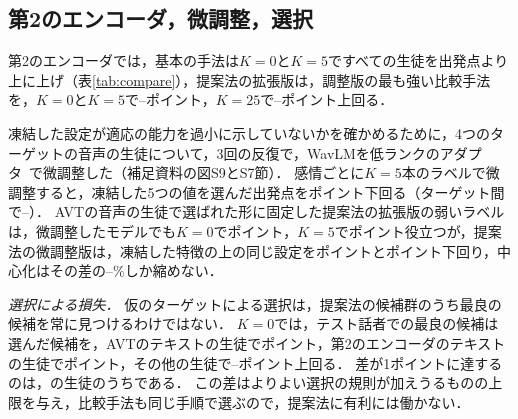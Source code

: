 \subsection{第2のエンコーダ，微調整，選択}
\label{sec:comparison-robust}

第2のエンコーダでは，基本の手法は$K=0$と$K=5$ですべての生徒を出発点より上に上げ（表\ref{tab:compare}），提案法の拡張版は，調整版の最も強い比較手法を，$K=0$と$K=5$で--ポイント，$K=25$で--ポイント上回る．

凍結した設定が適応の能力を過小に示していないかを確かめるために，4つのターゲットの音声の生徒について，3回の反復で，WavLMを低ランクのアダプタ~\cite{hu2022lora}で微調整した（補足資料の図S9とS7節）．
感情ごとに$K=5$本のラベルで微調整すると，凍結した5つの値を選んだ出発点をポイント下回る（ターゲット間で--）．
AVTの音声の生徒で選ばれた形に固定した提案法の拡張版の弱いラベルは，微調整したモデルでも$K=0$でポイント，$K=5$でポイント役立つが，提案法の微調整版は，凍結した特徴の上の同じ設定をポイントとポイント下回り，中心化はその差の--\%しか縮めない．

\emph{選択による損失．}
\label{sec:comparison-selection}
仮のターゲットによる選択は，提案法の候補群のうち最良の候補を常に見つけるわけではない．
$K=0$では，テスト話者での最良の候補は選んだ候補を，AVTのテキストの生徒でポイント，第2のエンコーダのテキストの生徒でポイント，その他の生徒で--ポイント上回る．
差が1ポイントに達するのは，の生徒のうちである．
この差はよりよい選択の規則が加えうるものの上限を与え，比較手法も同じ手順で選ぶので，提案法に有利には働かない．

